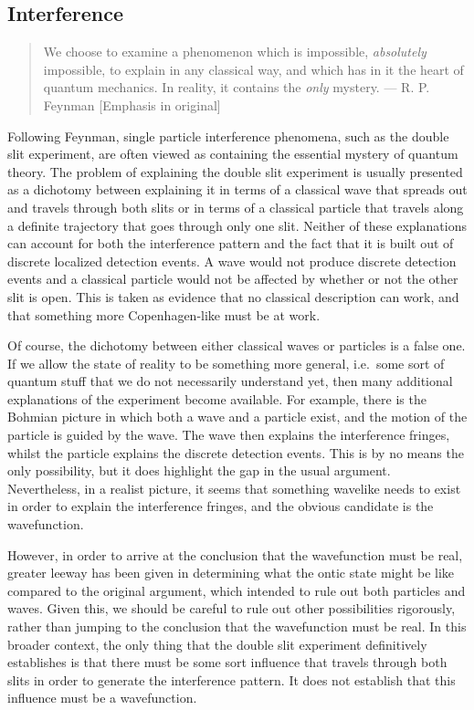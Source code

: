 \documentclass[DIV=calc,fontsize=12pt]{scrartcl} %
\theoremstyle{definition}
\theoremstyle{plain}
\begin{document}
\subsection{Interference}

\label{Int}

\begin{quote}
We choose to examine a phenomenon which is impossible,
\emph{absolutely} impossible, to explain in any classical way, and
which has in it the heart of quantum mechanics.  In reality, it
contains the \emph{only} mystery. --- R. P. Feynman
\cite{Feynman2010} [Emphasis in original]
\end{quote}

Following Feynman, single particle interference phenomena, such as the
double slit experiment, are often viewed as containing the essential
mystery of quantum theory.  The problem of explaining the double slit
experiment is usually presented as a dichotomy between explaining it
in terms of a classical wave that spreads out and travels through both
slits or in terms of a classical particle that travels along a
definite trajectory that goes through only one slit.  Neither of these
explanations can account for both the interference pattern and the
fact that it is built out of discrete localized detection events.  A
wave would not produce discrete detection events and a classical
particle would not be affected by whether or not the other slit is
open.  This is taken as evidence that no classical description can
work, and that something more Copenhagen-like must be at work.

Of course, the dichotomy between either classical waves or particles
is a false one.  If we allow the state of reality to be something more
general, i.e.\ some sort of quantum stuff that we do not necessarily
understand yet, then many additional explanations of the experiment
become available.  For example, there is the Bohmian picture in which
both a wave and a particle exist, and the motion of the particle is
guided by the wave.  The wave then explains the interference fringes,
whilst the particle explains the discrete detection events.  This is
by no means the only possibility, but it does highlight the gap in the
usual argument.  Nevertheless, in a realist picture, it seems that
something wavelike needs to exist in order to explain the interference
fringes, and the obvious candidate is the wavefunction.

However, in order to arrive at the conclusion that the wavefunction
must be real, greater leeway has been given in determining what the
ontic state might be like compared to the original argument, which
intended to rule out both particles and waves.  Given this, we should
be careful to rule out other possibilities rigorously, rather than
jumping to the conclusion that the wavefunction must be real.  In this
broader context, the only thing that the double slit experiment
definitively establishes is that there must be some sort influence
that travels through both slits in order to generate the interference
pattern.  It does not establish that this influence must be a
wavefunction.
\end{document}
